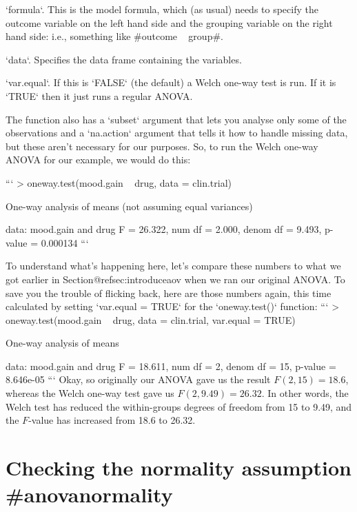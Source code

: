 \item `formula`. This is the model formula, which (as usual) needs to specify the outcome variable on the left hand side and the grouping variable on the right hand side: i.e., something like \rtextverb#outcome ~ group#.
\item `data`. Specifies the data frame containing the variables. 
\item `var.equal`. If this is `FALSE` (the default) a Welch one-way test is run. If it is `TRUE` then it just runs a regular ANOVA. 

The function also has a `subset` argument that lets you analyse only some of the observations and a `na.action` argument that tells it how to handle missing data, but these aren't necessary for our purposes. So, to run the Welch one-way ANOVA for our example, we would do this:

```
> oneway.test(mood.gain ~ drug, data = clin.trial)

	One-way analysis of means (not assuming equal variances)

data:  mood.gain and drug 
F = 26.322, num df = 2.000, denom df = 9.493, p-value = 0.000134
```


To understand what's happening here, let's compare these numbers to what we got earlier in Section@refsec:introduceaov when we ran our original ANOVA. To save you the trouble of flicking back, here are those numbers again, this time calculated by setting `var.equal = TRUE` for the `oneway.test()` function:
```
> oneway.test(mood.gain ~ drug, data = clin.trial, var.equal = TRUE)

	One-way analysis of means

data:  mood.gain and drug 
F = 18.611, num df = 2, denom df = 15, p-value = 8.646e-05
```
Okay, so originally our ANOVA gave us the result $F(2,15) = 18.6$, whereas the Welch one-way test gave us $F(2,9.49) = 26.32$. In other words, the Welch test has reduced the within-groups degrees of freedom from 15 to 9.49, and the $F$-value has increased from 18.6 to 26.32. 


\section{Checking the normality assumption {#anovanormality}}

